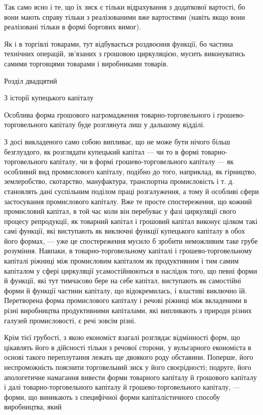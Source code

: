 Так само ясно і те, що їх зиск є тільки відрахування з додаткової
вартості, бо вони мають справу тільки з реалізованими
вже вартостями (навіть якщо вони реалізовані тільки в формі
боргових вимог).

Як і в торгівлі товарами, тут відбувається роздвоєння функції,
бо частина технічних операцій, зв’язаних з грошовою циркуляцією,
мусить виконуватись самими торговцями товарами
і виробниками товарів.

Розділ двадцятий

З історії купецького капіталу

Особлива форма грошового нагромадження товарно-торговельного
і грошево-торговельного капіталу буде розглянута лиш у
дальшому відділі.

З досі викладеного само собою випливає, що не може бути
нічого більш безглуздого, як розглядати купецький капітал —
чи то в формі товарно-торговельного капіталу, чи в формі грошево-торговельного
капіталу — як особливий вид промислового
капіталу, подібно до того, наприклад, як гірництво, землеробство,
скотарство, мануфактура, транспортна промисловість і т. д.
становлять дані суспільним поділом праці розгалуження, а тому й
особливі сфери застосування промислового капіталу. Вже те
просте спостереження, що кожний промисловий капітал, в той час
коли він перебуває у фазі циркуляції свого процесу репродукції,
як товарний капітал і грошовий капітал виконує цілком такі
самі функції, які виступають як виключні функції купецького
капіталу в обох його формах, — уже це спостереження мусило б
зробити неможливим таке грубе розуміння. Навпаки, в товарно-торговельному
капіталі і грошево-торговельному капіталі ріжниці
між промисловим капіталом як продуктивним і тим самим
капіталом у сфері циркуляції усамостійнюються в наслідок того,
що певні форми й функції, які тут тимчасово бере на себе капітал,
виступають як самостійні форми й функції частини капіталу,
що відокремилась, і властиві виключно їй. Перетворена форма
промислового капіталу і речові ріжниці між вкладеними в різні
виробництва продуктивними капіталами, які випливають з природи
різних галузей промисловості, є речі зовсім різні.

Крім тієї грубості, з якою економіст взагалі розглядає відмінності
форм, що цікавлять його в дійсності тільки з речової сторони,
у вульгарного економіста в основі такого переплутання
лежать ще двоякого роду обставини. Поперше, його неспроможність
пояснити торговельний зиск у його своєрідності; подруге,
його апологетичне намагання вивести форми товарного капіталу
й грошового капіталу і далі товарно-торговельного капіталу й
грошево-торговельного капіталу, — форми, що виникають з специфічної
форми капіталістичного способу виробництва, який
\parbreak{}  %
